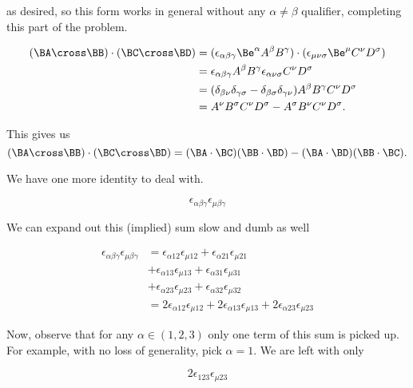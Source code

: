 as desired, so this form works in general without any $\alpha \ne \beta$ qualifier, completing this part of the problem.

\begin{align*}
(\BA \cross \BB) \cdot (\BC \cross \BD)
&=
(\epsilon_{\alpha \beta \gamma} \Be^\alpha A^\beta B^\gamma ) \cdot
(\epsilon_{\mu \nu \sigma} \Be^\mu C^\nu D^\sigma ) \\
&=
\epsilon_{\alpha \beta \gamma} A^\beta B^\gamma
\epsilon_{\alpha \nu \sigma} C^\nu D^\sigma \\
&=
(
\delta_{\beta \nu} \delta_{\gamma\sigma}
-\delta_{\beta \sigma} \delta_{\gamma\nu} )
A^\beta B^\gamma
C^\nu D^\sigma \\
&=
A^\nu B^\sigma
C^\nu D^\sigma
-A^\sigma B^\nu
C^\nu D^\sigma.
\end{align*}

This gives us
\begin{equation}\label{eqn:relElectroDynProblemSet3:190}
(\BA \cross \BB) \cdot (\BC \cross \BD)
=
(\BA \cdot \BC)
(\BB \cdot \BD)
-
(\BA \cdot \BD)
(\BB \cdot \BC).
\end{equation}

We have one more identity to deal with.

\begin{equation}\label{eqn:relElectroDynProblemSet3:210}
\epsilon_{\alpha \beta \gamma}
\epsilon_{\mu \beta \gamma}
\end{equation}

We can expand out this (implied) sum slow and dumb as well

\begin{align*}
\epsilon_{\alpha \beta \gamma}
\epsilon_{\mu \beta \gamma}
&=
\epsilon_{\alpha 1 2} \epsilon_{\mu 1 2}
+\epsilon_{\alpha 2 1} \epsilon_{\mu 2 1} \\
&+\epsilon_{\alpha 1 3} \epsilon_{\mu 1 3}
+\epsilon_{\alpha 3 1} \epsilon_{\mu 3 1} \\
&+\epsilon_{\alpha 2 3} \epsilon_{\mu 2 3}
+\epsilon_{\alpha 3 2} \epsilon_{\mu 3 2} \\
&=
2 \epsilon_{\alpha 1 2} \epsilon_{\mu 1 2}
+ 2 \epsilon_{\alpha 1 3} \epsilon_{\mu 1 3}
+ 2 \epsilon_{\alpha 2 3} \epsilon_{\mu 2 3}
\end{align*}

Now, observe that for any $\alpha \in (1,2,3)$ only one term of this sum is picked up.  For example, with no loss of generality, pick $\alpha = 1$.  We are left with only

\begin{equation}\label{eqn:relElectroDynProblemSet3:230}
2 \epsilon_{1 2 3} \epsilon_{\mu 2 3}
\end{equation}

